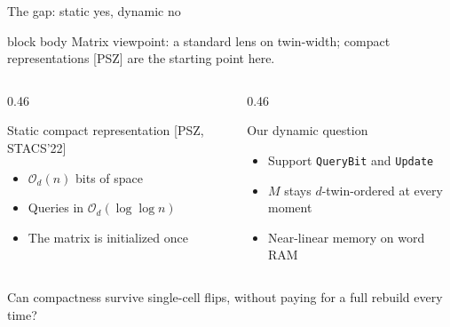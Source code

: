 \documentclass[aspectratio=169,11pt]{beamer}
\newcommand{\Oh}{\mathcal{O}}
\begin{document}
\begin{frame}{The gap: static yes, dynamic no}
\begin{beamercolorbox}[wd=\textwidth,sep=0.55ex,rounded=true]{block body}
{\small Matrix viewpoint: a standard lens on twin-width; compact representations [PSZ] are the starting point here.}
\end{beamercolorbox}

\smallskip
\begin{columns}[T]
\begin{column}{0.46\textwidth}
\begin{block}{Static compact representation {\small[PSZ, STACS'22]}}
\begin{itemize}
\item $\Oh_d(n)$ bits of space
\item Queries in $\Oh_d(\log\log n)$
\item The matrix is initialized once
\end{itemize}
\end{block}
\end{column}
\begin{column}{0.46\textwidth}
\begin{alertblock}{Our dynamic question}
\begin{itemize}
\item Support \texttt{QueryBit} and \texttt{Update}
\item $M$ stays $d$-twin-ordered at every moment
\item Near-linear memory on word RAM
\end{itemize}
\end{alertblock}
\end{column}
\end{columns}

\bigskip
\centering
{}

\smallskip
{\small Can compactness survive single-cell flips, without paying for a full rebuild every time?}
\end{frame}
\end{document}
